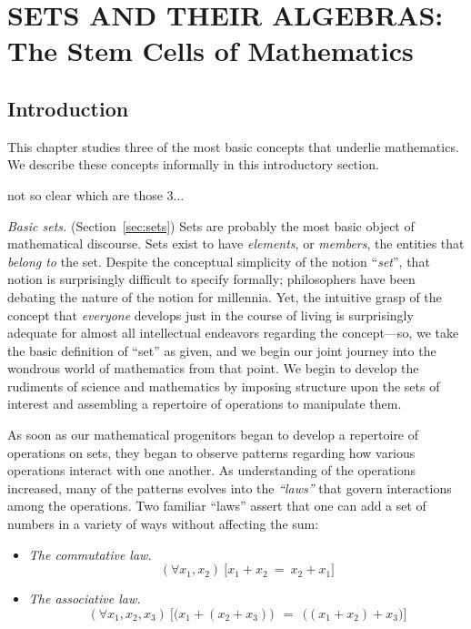 
\chapter{SETS AND THEIR ALGEBRAS: \\
The Stem Cells of Mathematics}
\label{ch:sets-BA-logic}



\section{Introduction}

This chapter studies three of the most basic concepts that underlie
mathematics.  We describe these concepts informally in this
introductory section.

{\Denis not so clear which are those 3...}

\bigskip

{\it Basic sets.}  (Section~\ref{sec:sets}) Sets are
probably the most basic object of mathematical discourse.  Sets exist
to have {\it elements},  or {\it members},
 the entities that {\em belong to} 
 the set.  Despite the conceptual
simplicity of the notion ``{\it set}'', that notion is surprisingly
difficult to specify formally; philosophers have been debating the
nature of the notion for millennia.  Yet, the intuitive grasp of the
concept that {\em everyone} develops just in the course of living is
surprisingly adequate for almost all intellectual endeavors regarding
the concept---so, we take the basic definition of ``set'' as given,
and we begin our joint journey into the wondrous world of mathematics
from that point.  We begin to develop the rudiments of science and
mathematics by imposing structure upon the sets of interest and
assembling a repertoire of operations to manipulate them.

As soon as our mathematical progenitors began to develop a repertoire
of operations on sets, they began to observe patterns regarding how
various operations interact with one another.  As understanding of the
operations increased, many of the patterns evolves into the {\em
  ``laws''} that govern interactions among the operations.  Two
familiar ``laws'' assert that one can add a set of numbers in a
variety of ways without affecting the sum:
\begin{itemize}
\item
{\it The commutative law.}
\[ (\forall x_1, x_2) \ \big[ x_1 + x_2 \ = \ x_2 + x_1 \big] \]

\item
{\it The associative law.}
\[ (\forall x_1, x_2, x_3) \ \big[ \big(x_1 + (x_2 + x_3)\big) \ \
= \ \ \big((x_1 + x_2) + x_3\big) \big]
\]
\end{itemize}

